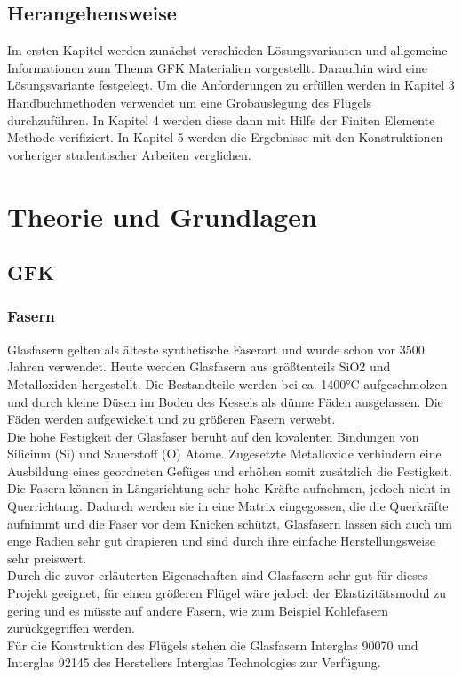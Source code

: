 \documentclass[a4paper,12p]{article}
\begin{document}
\subsection{Herangehensweise}
Im ersten Kapitel werden zunächst verschieden Lösungsvarianten und allgemeine Informationen zum Thema GFK Materialien vorgestellt. Daraufhin wird eine Lösungsvariante festgelegt. Um die Anforderungen zu erfüllen werden in Kapitel 3 Handbuchmethoden verwendet um eine Grobauslegung des Flügels durchzuführen. In Kapitel 4 werden diese dann mit Hilfe der Finiten Elemente Methode verifiziert. In Kapitel 5 werden die Ergebnisse mit den Konstruktionen vorheriger studentischer Arbeiten verglichen.

\section{Theorie und Grundlagen}
\subsection{GFK}
\subsubsection{Fasern}
Glasfasern gelten als älteste synthetische Faserart und wurde schon vor 3500 Jahren verwendet. Heute werden Glasfasern aus größtenteils SiO2 und Metalloxiden hergestellt. Die Bestandteile werden bei ca. 1400°C aufgeschmolzen und durch kleine Düsen im Boden des Kessels als dünne Fäden ausgelassen. Die Fäden werden aufgewickelt und zu größeren Fasern verwebt. \cite {item3}\\
Die hohe Festigkeit der Glasfaser beruht auf den kovalenten Bindungen von Silicium (Si) und Sauerstoff (O) Atome. Zugesetzte Metalloxide verhindern eine Ausbildung eines geordneten Gefüges und erhöhen somit zusätzlich die Festigkeit. Die Fasern können in Längsrichtung sehr hohe Kräfte aufnehmen, jedoch nicht in Querrichtung. Dadurch werden sie in eine Matrix eingegossen, die die Querkräfte aufnimmt und die Faser vor dem Knicken schützt. Glasfasern lassen sich auch um enge Radien sehr gut drapieren und sind durch ihre einfache Herstellungsweise sehr preiswert. \cite{item4}\\
Durch die zuvor erläuterten Eigenschaften sind Glasfasern sehr gut für dieses Projekt geeignet, für einen größeren Flügel wäre jedoch der Elastizitätsmodul zu gering und es müsste auf andere Fasern, wie zum Beispiel Kohlefasern zurückgegriffen werden. \\
Für die Konstruktion des Flügels stehen die Glasfasern Interglas 90070 und Interglas 92145 des Herstellers Interglas Technologies zur Verfügung. 
\end{document}
